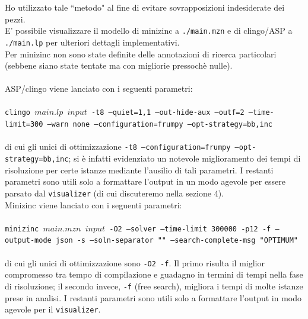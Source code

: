 \documentclass{article}
\begin{document}
Ho utilizzato tale ``metodo" al fine di evitare sovrapposizioni indesiderate dei pezzi. \\
E' possibile visualizzare il modello di minizinc a \texttt{./main.mzn} e di clingo/ASP a \texttt{./main.lp} per ulteriori dettagli implementativi.\\
Per minizinc non sono state definite delle annotazioni di ricerca particolari (sebbene siano state tentate ma con migliorie pressoch\`e nulle).\\\\
ASP/clingo viene lanciato con i seguenti parametri:\\\\
\hspace*{.5cm}\texttt{clingo $main.lp$ $input$ -t8 --quiet=1,1 --out-hide-aux --outf=2 --time-limit=300 --warn none --configuration=frumpy --opt-strategy=bb,inc}\\\\
di cui gli unici di ottimizzazione \texttt{-t8 --configuration=frumpy --opt-strategy=bb,inc}; si è infatti evidenziato un notevole miglioramento dei tempi di risoluzione per certe istanze mediante l'ausilio di tali parametri. I restanti parametri sono utili solo a formattare l'output in un modo agevole per essere parsato dal \texttt{visualizer} (di cui discuteremo nella sezione 4).\\
Minizinc viene lanciato con i seguenti parametri:\\\\
\hspace*{.5cm}\texttt{minizinc $main.mzn$ $input$ -O2 --solver {} --time-limit 300000 -p12 -f --output-mode json -s --soln-separator "" --search-complete-msg "OPTIMUM"}\\\\
di cui gli unici di ottimizzazione sono \texttt{-O2 -f}. Il primo risulta il miglior compromesso tra tempo di compilazione e guadagno in termini di tempi nella fase di risoluzione; il secondo invece, \texttt{-f} (free search), migliora i tempi di molte istanze prese in analisi. I restanti parametri sono utili solo a formattare l'output in modo agevole per il \texttt{visualizer}.
\end{document}
